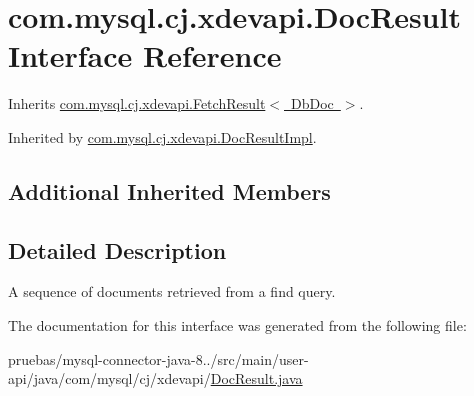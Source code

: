 \hypertarget{interfacecom_1_1mysql_1_1cj_1_1xdevapi_1_1_doc_result}{}\section{com.\+mysql.\+cj.\+xdevapi.\+Doc\+Result Interface Reference}
\label{interfacecom_1_1mysql_1_1cj_1_1xdevapi_1_1_doc_result}


Inherits \mbox{\hyperlink{interfacecom_1_1mysql_1_1cj_1_1xdevapi_1_1_fetch_result}{com.\+mysql.\+cj.\+xdevapi.\+Fetch\+Result$<$ Db\+Doc $>$}}.



Inherited by \mbox{\hyperlink{classcom_1_1mysql_1_1cj_1_1xdevapi_1_1_doc_result_impl}{com.\+mysql.\+cj.\+xdevapi.\+Doc\+Result\+Impl}}.

\subsection*{Additional Inherited Members}


\subsection{Detailed Description}
A sequence of documents retrieved from a find query. 

The documentation for this interface was generated from the following file\+:\begin{DoxyCompactItemize}
\item 
pruebas/mysql-\/connector-\/java-\/8../src/main/user-\/api/java/com/mysql/cj/xdevapi/\mbox{\hyperlink{_doc_result_8java}{Doc\+Result.\+java}}\end{DoxyCompactItemize}
